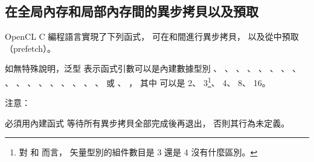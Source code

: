 \subsection{在全局內存和局部內存間的異步拷貝以及預取}

OpenCL C 編程語言實現了下列函式，
可在和間進行異步拷貝，
以及從中預取（prefetch）。

如無特殊說明，泛型  表示函式引數可以是內建數據型別
 、 、 、 、
 、 、 、 、
 、 、 、 、
 、 、 、 、
 、  或 、 ，
其中  可以是 2、 3\footnote{
對  和  而言，
矢量型別的組件數目是 3 還是 4 沒有什麼區別。}、 4、 8、 16。

{}

注意：

必須用內建函式  等待所有異步拷貝全部完成後再退出，
否則其行為未定義。

